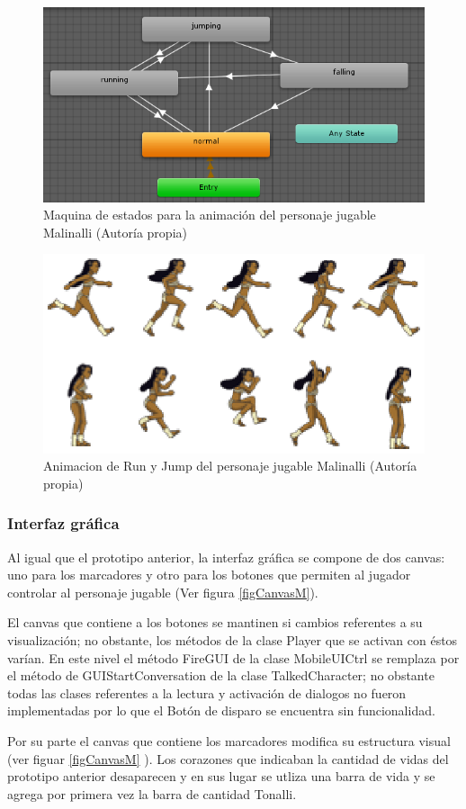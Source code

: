 \begin{figure}
  \centering
   \includegraphics[width=0.4 \textwidth]{05TrabajoRealizado/03Unity/imagenes/03MaquinaEstadosMalinalli}
  \caption{Maquina de estados para la animación del personaje jugable Malinalli (Autoría propia)}
  \label{figMaqMalinalli}
\end{figure}

\begin{figure}
  \centering
   \includegraphics[width=0.4 \textwidth]{05TrabajoRealizado/03Unity/imagenes/bloquesanimacionMalinalli}
  \caption{Animacion de Run y Jump del personaje jugable Malinalli (Autoría propia)}
  \label{figAniMalinalli}
\end{figure}

\subsubsection{Interfaz gráfica}
Al igual que el prototipo anterior, la interfaz gráfica se compone de dos canvas: uno 
para los marcadores y otro para los botones que permiten al jugador controlar al personaje jugable (Ver figura \ref{figCanvasM}).
\\
\par
El canvas que contiene a los botones se mantinen si cambios referentes a su 
visualización; no obstante, los métodos de la clase Player que se activan con 
éstos varían. En este nivel el método FireGUI de la clase MobileUICtrl se 
remplaza por el método de GUIStartConversation de la clase TalkedCharacter; no 
obstante todas las clases referentes a la lectura y activación de dialogos no 
fueron implementadas por lo que el Botón de disparo se encuentra sin funcionalidad.
\\
\par
Por su parte el canvas que contiene los marcadores modifica su estructura visual (ver 
figuar \ref{figCanvasM} ). Los corazones que indicaban la cantidad de vidas del prototipo anterior 
desaparecen y en sus lugar se utliza una barra de vida y se agrega por primera vez la  
barra de cantidad Tonalli.  

